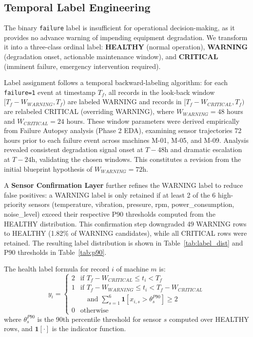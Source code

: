 \documentclass[conference]{IEEEtran}
\begin{document}
\subsection{Temporal Label Engineering}

The binary \texttt{failure} label is insufficient for operational decision-making, as it provides no advance warning of impending equipment degradation. We transform it into a three-class ordinal label: \textbf{HEALTHY} (normal operation), \textbf{WARNING} (degradation onset, actionable maintenance window), and \textbf{CRITICAL} (imminent failure, emergency intervention required).

Label assignment follows a temporal backward-labeling algorithm: for each \texttt{failure=1} event at timestamp $T_f$, all records in the look-back window $[T_f - W_{WARNING}, T_f)$ are labeled WARNING and records in $[T_f - W_{CRITICAL}, T_f)$ are relabeled CRITICAL (overriding WARNING), where $W_{WARNING} = 48$ hours and $W_{CRITICAL} = 24$ hours. These window parameters were derived empirically from Failure Autopsy analysis (Phase 2 EDA), examining sensor trajectories 72 hours prior to each failure event across machines M-01, M-05, and M-09. Analysis revealed consistent degradation signal onset at $T-48$h and dramatic escalation at $T-24$h, validating the chosen windows. This constitutes a revision from the initial blueprint hypothesis of $W_{WARNING} = 72$h.

A \textbf{Sensor Confirmation Layer} further refines the WARNING label to reduce false positives: a WARNING label is only retained if at least 2 of the 6 high-priority sensors (temperature, vibration, pressure, rpm, power\_consumption, noise\_level) exceed their respective P90 thresholds computed from the HEALTHY distribution. This confirmation step downgraded 49 WARNING rows to HEALTHY (1.82\% of WARNING candidates), while all CRITICAL rows were retained. The resulting label distribution is shown in Table~\ref{tab:label_dist} and P90 thresholds in Table~\ref{tab:p90}.

The health label formula for record $i$ of machine $m$ is:
\begin{equation}
y_i = \begin{cases}
2 & \text{if } T_f - W_{CRITICAL} \leq t_i < T_f \\
1 & \text{if } T_f - W_{WARNING} \leq t_i < T_f - W_{CRITICAL} \\
  & \quad \text{and } \sum_{s=1}^{6} \mathbf{1}[x_{i,s} > \theta_s^{P90}] \geq 2 \\
0 & \text{otherwise}
\end{cases}
\label{eq:label}
\end{equation}
where $\theta_s^{P90}$ is the 90th percentile threshold for sensor $s$ computed over HEALTHY rows, and $\mathbf{1}[\cdot]$ is the indicator function.
\end{document}
